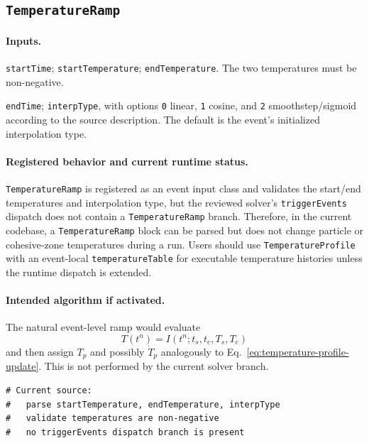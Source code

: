 \subsection{\texttt{TemperatureRamp}}
\label{subsec:event-temperature-ramp}

\paragraph{Inputs.}
\begin{description}[leftmargin=*,style=nextline]
\item[\textbf{Required.}] \texttt{startTime}; \texttt{startTemperature}; \texttt{endTemperature}.  The two temperatures must be non-negative.
\item[\textbf{Optional.}] \texttt{endTime}; \texttt{interpType}, with options \texttt{0} linear, \texttt{1} cosine, and \texttt{2} smoothstep/sigmoid according to the source description.  The default is the event's initialized interpolation type.
\end{description}

\paragraph{Registered behavior and current runtime status.}
\texttt{TemperatureRamp} is registered as an event input class and validates the start/end temperatures and interpolation type, but the reviewed solver's \texttt{triggerEvents} dispatch does not contain a \texttt{TemperatureRamp} branch.  Therefore, in the current codebase, a \texttt{TemperatureRamp} block can be parsed but does not change particle or cohesive-zone temperatures during a run.  Users should use \texttt{TemperatureProfile} with an event-local \texttt{temperatureTable} for executable temperature histories unless the runtime dispatch is extended.

\paragraph{Intended algorithm if activated.}
The natural event-level ramp would evaluate
\begin{equation}
  T(t^n)=I(t^n;t_s,t_e,T_s,T_e)
\end{equation}
and then assign $T_p$ and possibly $\dot{T}_p$ analogously to Eq.~\eqref{eq:temperature-profile-update}.  This is not performed by the current solver branch.

\begin{lstlisting}[caption={TemperatureRamp registered-input pseudocode.}]
# Current source:
#   parse startTemperature, endTemperature, interpType
#   validate temperatures are non-negative
#   no triggerEvents dispatch branch is present
\end{lstlisting}

